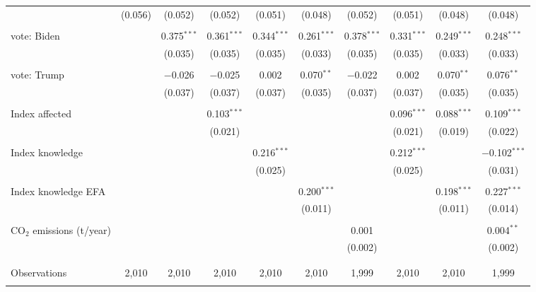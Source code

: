 \begin{tabular}{@{\extracolsep{5pt}}lccccccccc}
  & (0.056) & (0.052) & (0.052) & (0.051) & (0.048) & (0.052) & (0.051) & (0.048) & (0.048) \\ 
  & & & & & & & & & \\ 
 vote: Biden &  & 0.375$^{***}$ & 0.361$^{***}$ & 0.344$^{***}$ & 0.261$^{***}$ & 0.378$^{***}$ & 0.331$^{***}$ & 0.249$^{***}$ & 0.248$^{***}$ \\ 
  &  & (0.035) & (0.035) & (0.035) & (0.033) & (0.035) & (0.035) & (0.033) & (0.033) \\ 
  & & & & & & & & & \\ 
 vote: Trump &  & $-$0.026 & $-$0.025 & 0.002 & 0.070$^{**}$ & $-$0.022 & 0.002 & 0.070$^{**}$ & 0.076$^{**}$ \\ 
  &  & (0.037) & (0.037) & (0.037) & (0.035) & (0.037) & (0.037) & (0.035) & (0.035) \\ 
  & & & & & & & & & \\ 
 Index affected &  &  & 0.103$^{***}$ &  &  &  & 0.096$^{***}$ & 0.088$^{***}$ & 0.109$^{***}$ \\ 
  &  &  & (0.021) &  &  &  & (0.021) & (0.019) & (0.022) \\ 
  & & & & & & & & & \\ 
 Index knowledge &  &  &  & 0.216$^{***}$ &  &  & 0.212$^{***}$ &  & $-$0.102$^{***}$ \\ 
  &  &  &  & (0.025) &  &  & (0.025) &  & (0.031) \\ 
  & & & & & & & & & \\ 
 Index knowledge EFA &  &  &  &  & 0.200$^{***}$ &  &  & 0.198$^{***}$ & 0.227$^{***}$ \\ 
  &  &  &  &  & (0.011) &  &  & (0.011) & (0.014) \\ 
  & & & & & & & & & \\ 
 CO$_{2}$ emissions (t/year) &  &  &  &  &  & 0.001 &  &  & 0.004$^{**}$ \\ 
  &  &  &  &  &  & (0.002) &  &  & (0.002) \\ 
  & & & & & & & & & \\ 
\hline \\[-1.8ex] 

Observations & 2,010 & 2,010 & 2,010 & 2,010 & 2,010 & 1,999 & 2,010 & 2,010 & 1,999 \\ 
\hline 
\hline \\[-1.8ex] 
\end{tabular} 